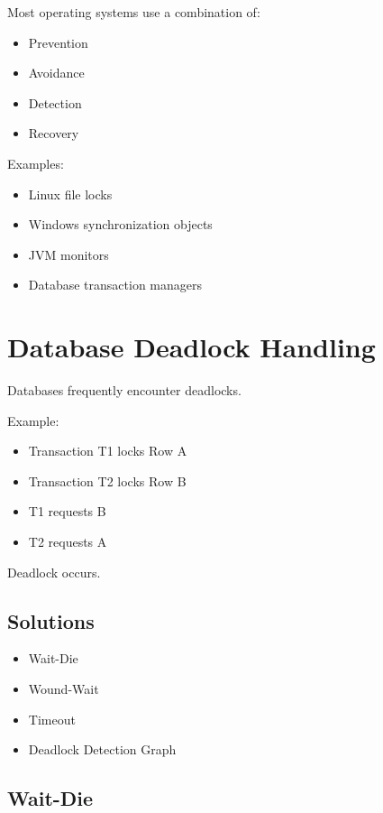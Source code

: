 Most operating systems use a combination of:

\begin{itemize}
\item Prevention
\item Avoidance
\item Detection
\item Recovery
\end{itemize}

Examples:

\begin{itemize}
\item Linux file locks
\item Windows synchronization objects
\item JVM monitors
\item Database transaction managers
\end{itemize}

\section{Database Deadlock Handling}

Databases frequently encounter deadlocks.

Example:

\begin{itemize}
\item Transaction T1 locks Row A
\item Transaction T2 locks Row B
\item T1 requests B
\item T2 requests A
\end{itemize}

Deadlock occurs.

\subsection{Solutions}

\begin{itemize}
\item Wait-Die
\item Wound-Wait
\item Timeout
\item Deadlock Detection Graph
\end{itemize}

\subsection{Wait-Die}

